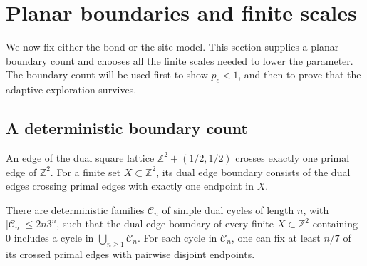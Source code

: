 \section{Planar boundaries and finite scales}\label{sec:preliminaries}

We now fix either the bond or the site model. This section supplies a planar
boundary count and chooses all the finite scales needed to lower the parameter.
The boundary count will be used first to show $p_c<1$, and then to prove that
the adaptive exploration survives.

\subsection{A deterministic boundary count}

An edge of the dual square lattice
$\mathbb Z^2+(1/2,1/2)$ crosses exactly one primal edge of $\mathbb Z^2$.
For a finite set $X\subset\mathbb Z^2$, its dual edge boundary consists of
the dual edges crossing primal edges with exactly one endpoint in $X$.

\begin{lemma}\label{prelim:contours}
There are deterministic families $\mathcal C_n$ of simple dual cycles of
length $n$, with $|\mathcal C_n|\le 2n3^n$, such that the dual edge boundary
of every finite $X\subset\mathbb Z^2$ containing $0$ includes a cycle in
$\bigcup_{n\ge1}\mathcal C_n$. For each cycle in $\mathcal C_n$, one can
fix at least $n/7$ of its crossed primal edges with pairwise disjoint endpoints.
\end{lemma}

